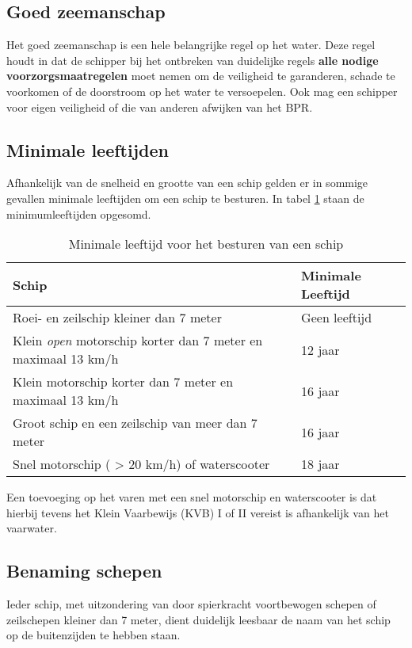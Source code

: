 \subsection{Goed zeemanschap}
Het goed zeemanschap is een hele belangrijke regel op het water. Deze regel houdt in dat de schipper bij het ontbreken van duidelijke regels \textbf{alle nodige voorzorgsmaatregelen} moet nemen om de veiligheid te garanderen, schade te voorkomen of de doorstroom op het water te versoepelen. Ook mag een schipper voor eigen veiligheid of die van anderen afwijken van het BPR.


\subsection{Minimale leeftijden}
Afhankelijk van de snelheid en grootte van een schip gelden er in sommige gevallen minimale leeftijden om een schip te besturen. In tabel \ref{tab:leeftijd} staan de minimumleeftijden opgesomd. 

\begin{table}[h]
	\centering
	\caption{Minimale leeftijd voor het besturen van een schip}
	\label{tab:leeftijd}
	\begin{tabular}{l|l}
		\textbf{Schip} & \textbf{Minimale Leeftijd} \\ \hline
		Roei- en zeilschip kleiner dan 7 meter			& Geen leeftijd \\
		Klein \textit{open} motorschip korter dan 7 meter en maximaal 13 km/h & 12 jaar \\
		Klein motorschip korter dan 7 meter en maximaal 13 km/h & 16 jaar \\
		Groot schip en een zeilschip van meer dan 7 meter & 16 jaar \\
		Snel motorschip ( > 20 km/h) of waterscooter & 18 jaar
		
	\end{tabular}
\end{table}
Een toevoeging op het varen met een snel motorschip en waterscooter is dat hierbij tevens het Klein Vaarbewijs (KVB) I of II vereist is afhankelijk van het vaarwater.

\subsection{Benaming schepen}
Ieder schip, met uitzondering van door spierkracht voortbewogen schepen of zeilschepen kleiner dan 7 meter, dient duidelijk leesbaar de naam van het schip op de buitenzijden te hebben staan.

